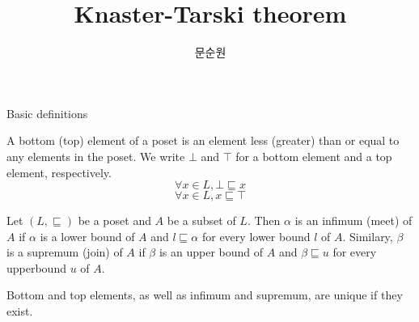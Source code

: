 \documentclass[9pt]{beamer}
\title{Knaster-Tarski theorem}
\author{문순원}
\begin{document}
\begin{frame}
  \titlepage
\end{frame}

\begin{frame}{Basic definitions}
  \begin{definition}
    A bottom (top) element of a poset is an element less (greater) than or equal to any elements in the poset.
    We write $\bot$ and $\top$ for a bottom element and a top element, respectively.
    $$
    \forall x \in L, \bot \sqsubseteq x
    $$
    $$
    \forall x \in L, x \sqsubseteq \top
    $$
  \end{definition}


  \begin{definition}
    Let $(L,\sqsubseteq)$ be a poset and $A$ be a subset of $L$.
    Then $\alpha$ is an infimum (meet) of $A$ if $\alpha$ is a lower bound of $A$
    and $l \sqsubseteq \alpha$ for every lower bound $l$ of $A$.
    Similary, $\beta$ is a supremum (join) of $A$ if $\beta$ is an upper bound of $A$
    and $\beta \sqsubseteq u$ for every upperbound $u$ of $A$.
  \end{definition}

  Bottom and top elements, as well as infimum and supremum, are unique if they exist.
\end{frame}
\end{document}
